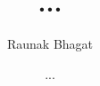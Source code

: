 \documentclass{article}
\newcommand{\myname}{Raunak Bhagat}
\begin{document}
\title{...}
\author{\myname}
\date{...}
\maketitle

\newpage

\end{document}
